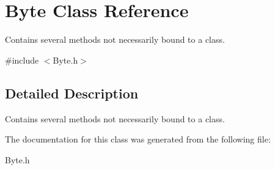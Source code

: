 \hypertarget{class_byte}{}\section{Byte Class Reference}
\label{class_byte}


Contains several methods not necessarily bound to a class.  




{\ttfamily \#include $<$Byte.\+h$>$}



\subsection{Detailed Description}
Contains several methods not necessarily bound to a class. 

The documentation for this class was generated from the following file\+:\begin{DoxyCompactItemize}
\item 
Byte.\+h\end{DoxyCompactItemize}
